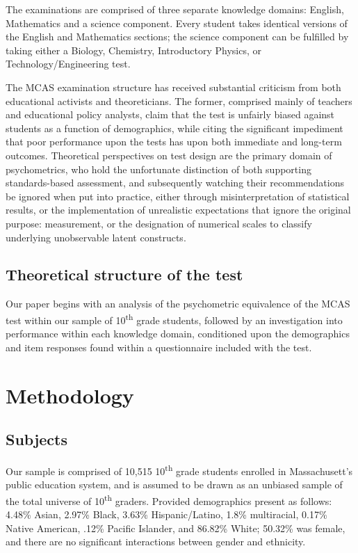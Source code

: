 \documentclass{article}\usepackage[]{graphicx}\usepackage[]{color}
\begin{document}
The examinations are comprised of three separate knowledge domains: English, Mathematics and a science component. Every student takes identical versions of the English and Mathematics sections; the science component can be fulfilled by taking either a Biology, Chemistry, Introductory Physics, or Technology/Engineering test. \cite{mcas_summary}

The MCAS examination structure has received substantial criticism from both educational activists and theoreticians. The former, comprised mainly of teachers and educational policy analysts, claim that the test is unfairly biased against students as a function of demographics, while citing the significant impediment that poor performance upon the tests has upon both immediate and long-term outcomes. \cite{Gaudet} Theoretical perspectives on test design are the primary domain of psychometrics, who hold the unfortunate distinction of both supporting standards-based assessment, and subsequently watching their recommendations be ignored when put into practice, either through misinterpretation of statistical results, or the implementation of unrealistic expectations that ignore the original purpose: measurement, or the designation of numerical scales to classify underlying unobservable latent constructs. 

\subsection{Theoretical structure of the test}
Our paper begins with an analysis of the psychometric equivalence of the MCAS test within our sample of 10\textsuperscript{th} grade students, followed by an investigation into performance within each knowledge domain, conditioned upon the demographics and item responses found within a questionnaire included with the test.

\section{Methodology}
\subsection{Subjects}
Our sample is comprised of 10,515 10\textsuperscript{th} grade students enrolled in Massachusett's public education system, and is assumed to be drawn as an unbiased sample of the total universe of 10\textsuperscript{th} graders. Provided demographics present as follows: 4.48\% Asian, 2.97\% Black, 3.63\% Hispanic/Latino, 1.8\% multiracial, 0.17\% Native American, .12\% Pacific Islander, and 86.82\% White; 50.32\% was female, and there are no significant interactions between gender and ethnicity.
\end{document}
